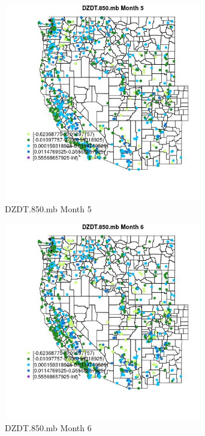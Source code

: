 \begin{figure} 
\centering  
\includegraphics[width=0.77\textwidth]{Code_Outputs/Report_ML_input_PM25_Step4_part_f_de_duplicated_aves_prioritize_24hr_obswNAs_MapObsMo5DZDT850mb.jpg} 
\caption{\label{fig:Report_ML_input_PM25_Step4_part_f_de_duplicated_aves_prioritize_24hr_obswNAsMapObsMo5DZDT850mb}DZDT.850.mb Month 5} 
\end{figure} 
 

\begin{figure} 
\centering  
\includegraphics[width=0.77\textwidth]{Code_Outputs/Report_ML_input_PM25_Step4_part_f_de_duplicated_aves_prioritize_24hr_obswNAs_MapObsMo6DZDT850mb.jpg} 
\caption{\label{fig:Report_ML_input_PM25_Step4_part_f_de_duplicated_aves_prioritize_24hr_obswNAsMapObsMo6DZDT850mb}DZDT.850.mb Month 6} 
\end{figure} 
 

